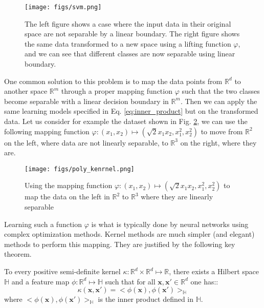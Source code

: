\begin{figure}[t]
	\centering
	\texttt{[image: figs/svm.png]}
	\caption[The case where classes aren't separable using linear boundary]{The left figure shows a case where the input data in their original space are not separable by a linear boundary. The right figure shows the same data transformed to a new space using a lifting function $\varphi$, and we can see that different classes are now separable  using linear boundary. }
	\label{fig:SVM_boundaries}
\end{figure}

One common solution to this problem is to map the data points from $\mathbb{R}^d$ to another space $\mathbb{R}^m$  through a proper mapping function $\varphi$ such that the two classes become separable with a linear decision boundary in $\mathbb{R}^m$. Then we can apply the same learning models specified in Eq. \ref{eq:inner_product} but on the transformed data. Let us consider for example the dataset shown in Fig. \ref{fig:polynomial_kernel},  we can use the following mapping function $\varphi:(x_1,x_2)\mapsto (\sqrt{2}x_1x_2,x_1^2,x_2^2)$ to move from $\mathbb{R}^2$ on the left, where data are not linearly separable, to $\mathbb{R}^3$ on the right, where they are.

\begin{figure}[t]
	\centering
	\texttt{[image: figs/poly\_kenrnel.png]}
	\caption[Lifting data to a higher-dimension space to get linearly separable classes]{ Using the mapping function $\varphi:(x_1,x_2)\mapsto (\sqrt{2}x_1x_2,x_1^2,x_2^2)$ to map the data on the left in $\mathbb{R}^2$ to $\mathbb{R}^3$ where they are linearly separable}
	\label{fig:polynomial_kernel}
\end{figure}

Learning such a function $\varphi$ is what is typically done by neural networks using complex optimization methods.  Kernel methods are much simpler (and elegant) methods to perform this mapping. They are justified by the following key theorem.

\begin{theorem}
	To every positive semi-definite kernel $\kappa:\mathbb{R}^d\times \mathbb{R}^d\mapsto \mathbb{R}$, there exists a Hilbert space $\mathbb{H}$ and a feature map $\phi:\mathbb{R}^d\mapsto\mathbb{H}$ such that for all $\mathbf{x},\mathbf{x}'\in\mathbb{R}^d$ one has:: 
	\begin{equation}
	\label{eq:kernel_main_equation}
	\kappa(\mathbf{x},\mathbf{x}')=<\phi(\mathbf{x}),\phi(\mathbf{x}')>_\mathbb{H}
	\end{equation}
	where $<\phi(\mathbf{x}),\phi(\mathbf{x}')>_\mathbb{H}$ is the inner product defined in $\mathbb{H}$.
\end{theorem}

